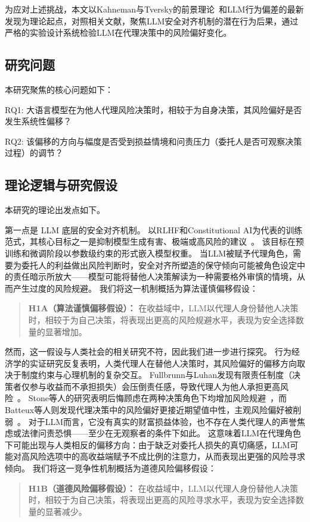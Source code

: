 \documentclass[journal]{vgtc}
\begin{document}
为应对上述挑战，本文以Kahneman与Tversky的前景理论~\cite{Kahneman1979Prospect}和LLM行为偏差的最新发现为理论起点，对照相关文献，聚焦LLM安全对齐机制的潜在行为后果，通过严格的实验设计系统检验LLM在代理决策中的风险偏好变化。

\subsection{研究问题}

本研究聚焦的核心问题如下：

RQ1: 大语言模型在为他人代理风险决策时，相较于为自身决策，其风险偏好是否发生系统性偏移？

RQ2: 该偏移的方向与幅度是否受到损益情境和问责压力（委托人是否可观察决策过程）的调节？

\subsection{理论逻辑与研究假设}

本研究的理论出发点如下。

第一点是 LLM 底层的安全对齐机制。
以RLHF和Constitutional AI为代表的训练范式，其核心目标之一是抑制模型生成有害、极端或高风险的建议~\cite{Ouyang2022Training,Bai2022Constitutional}。
该目标在预训练和微调阶段以参数级约束的形式嵌入模型权重。
当LLM被赋予代理角色，需要为委托人的利益做出风险判断时，安全对齐所塑造的保守倾向可能被角色设定中的责任暗示所放大——模型可能将替他人决策解读为一种需要格外审慎的情境，从而产生过度的风险规避。
我们将这一机制概括为算法谨慎偏移假设：
\begin{quote}
\textbf{H1A（算法谨慎偏移假设）：} 在收益域中，LLM以代理人身份替他人决策时，相较于为自己决策，将表现出更高的风险规避水平，表现为安全选择数量的显著增加。
\end{quote}

然而，这一假设与人类社会的相关研究不符，因此我们进一步进行探究。
行为经济学的实证研究反复表明，人类代理人在替他人决策时，其风险偏好的偏移方向取决于制度约束与心理机制的复杂交互。
Fullbrunn与Luhan发现有限责任制度（决策者仅参与收益而不承担损失）会压倒责任感，导致代理人为他人承担更高风险~\cite{Fullbrunn2019Responsibility}。
Stone等人的研究表明后悔顾虑在两种决策角色下均增加风险规避~\cite{Stone2002Risk}，而Batteux等人则发现代理决策中的风险偏好更接近期望值中性，主观风险偏好被削弱~\cite{Batteux2017Risk}。
对于LLM而言，它没有真实的财富损益体验，也不存在人类代理人的声誉焦虑或法律问责恐惧——至少在无观察者的条件下如此。
这意味着LLM在代理角色下可能出现与人类相反的偏移方向：由于缺乏对委托人损失的真切痛感，LLM可能对高风险选项中的高收益端赋予不成比例的注意力，从而表现出更强的风险寻求倾向。
我们将这一竞争性机制概括为道德风险偏移假设：
\begin{quote}
\textbf{H1B（道德风险偏移假设）：} 在收益域中，LLM以代理人身份替他人决策时，相较于为自己决策，将表现出更高的风险寻求水平，表现为安全选择数量的显著减少。
\end{quote}
\end{document}
